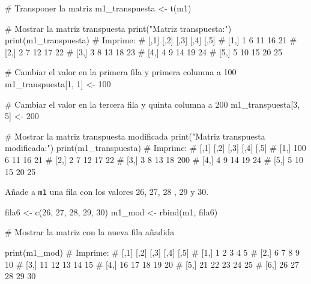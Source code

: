 \documentclass[
  letterpaper,
]{scrbook}
\newenvironment{Shaded}{\begin{snugshade}}{\end{snugshade}}
\newcommand{\CommentTok}[1]{\textcolor[rgb]{0.37,0.37,0.37}{#1}}
\newcommand{\DecValTok}[1]{\textcolor[rgb]{0.68,0.00,0.00}{#1}}
\newcommand{\FunctionTok}[1]{\textcolor[rgb]{0.28,0.35,0.67}{#1}}
\newcommand{\NormalTok}[1]{\textcolor[rgb]{0.00,0.23,0.31}{#1}}
\newcommand{\OtherTok}[1]{\textcolor[rgb]{0.00,0.23,0.31}{#1}}
\newcommand{\StringTok}[1]{\textcolor[rgb]{0.13,0.47,0.30}{#1}}
\begin{document}
\begin{Shaded}
\begin{Highlighting}[]
\CommentTok{\# Transponer la matriz}
\NormalTok{m1\_transpuesta }\OtherTok{\textless{}{-}} \FunctionTok{t}\NormalTok{(m1)}

\CommentTok{\# Mostrar la matriz transpuesta}
\FunctionTok{print}\NormalTok{(}\StringTok{"Matriz transpuesta:"}\NormalTok{)}
\FunctionTok{print}\NormalTok{(m1\_transpuesta)}
\CommentTok{\# Imprime:}
\CommentTok{\#      [,1] [,2] [,3] [,4] [,5]}
\CommentTok{\# [1,]    1    6   11   16   21}
\CommentTok{\# [2,]    2    7   12   17   22}
\CommentTok{\# [3,]    3    8   13   18   23}
\CommentTok{\# [4,]    4    9   14   19   24}
\CommentTok{\# [5,]    5   10   15   20   25}

\CommentTok{\# Cambiar el valor en la primera fila y primera columna a 100}
\NormalTok{m1\_transpuesta[}\DecValTok{1}\NormalTok{, }\DecValTok{1}\NormalTok{] }\OtherTok{\textless{}{-}} \DecValTok{100}

\CommentTok{\# Cambiar el valor en la tercera fila y quinta columna a 200}
\NormalTok{m1\_transpuesta[}\DecValTok{3}\NormalTok{, }\DecValTok{5}\NormalTok{] }\OtherTok{\textless{}{-}} \DecValTok{200}

\CommentTok{\# Mostrar la matriz transpuesta modificada}
\FunctionTok{print}\NormalTok{(}\StringTok{"Matriz transpuesta modificada:"}\NormalTok{)}
\FunctionTok{print}\NormalTok{(m1\_transpuesta)}
\CommentTok{\# Imprime:}
\CommentTok{\#      [,1] [,2] [,3] [,4] [,5]}
\CommentTok{\# [1,]  100    6   11   16   21}
\CommentTok{\# [2,]    2    7   12   17   22}
\CommentTok{\# [3,]    3    8   13   18  200}
\CommentTok{\# [4,]    4    9   14   19   24}
\CommentTok{\# [5,]    5   10   15   20   25}
\end{Highlighting}
\end{Shaded}

Añade a \texttt{m1} una fila con los valores 26, 27, 28 , 29 y 30.

\begin{Shaded}
\begin{Highlighting}[]
\NormalTok{fila6 }\OtherTok{\textless{}{-}} \FunctionTok{c}\NormalTok{(}\DecValTok{26}\NormalTok{, }\DecValTok{27}\NormalTok{, }\DecValTok{28}\NormalTok{, }\DecValTok{29}\NormalTok{, }\DecValTok{30}\NormalTok{)}
\NormalTok{m1\_mod }\OtherTok{\textless{}{-}} \FunctionTok{rbind}\NormalTok{(m1, fila6)}

\CommentTok{\# Mostrar la matriz con la nueva fila añadida}

\FunctionTok{print}\NormalTok{(m1\_mod)}
\CommentTok{\# Imprime:}
\CommentTok{\#      [,1] [,2] [,3] [,4] [,5]}
\CommentTok{\# [1,]    1    2    3    4    5}
\CommentTok{\# [2,]    6    7    8    9   10}
\CommentTok{\# [3,]   11   12   13   14   15}
\CommentTok{\# [4,]   16   17   18   19   20}
\CommentTok{\# [5,]   21   22   23   24   25}
\CommentTok{\# [6,]   26   27   28   29   30}
\end{Highlighting}
\end{Shaded}
\end{document}
